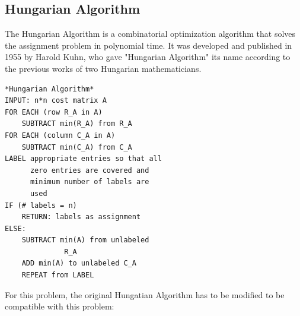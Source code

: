 \documentclass[twoside,twocolumn]{article}
\begin{document}
    \subsection{Hungarian Algorithm}
    The Hungarian Algorithm is a combinatorial optimization algorithm that solves the assignment problem in polynomial time.
    It was developed and published in 1955 by Harold Kuhn, who gave "Hungarian Algorithm" its name according to the previous works
    of two Hungarian mathematicians.
    \begin{lstlisting}
*Hungarian Algorithm*
INPUT: n*n cost matrix A
FOR EACH (row R_A in A)
    SUBTRACT min(R_A) from R_A
FOR EACH (column C_A in A)
    SUBTRACT min(C_A) from C_A
LABEL appropriate entries so that all
      zero entries are covered and 
      minimum number of labels are 
      used
IF (# labels = n)
    RETURN: labels as assignment    
ELSE:
    SUBTRACT min(A) from unlabeled 
              R_A
    ADD min(A) to unlabeled C_A
    REPEAT from LABEL
    \end{lstlisting}
    For this problem, the original Hungatian Algorithm has to be modified to be compatible with this problem:
\end{document}
